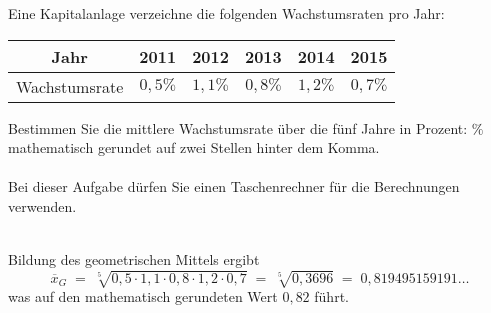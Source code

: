 \begin{MIntro}
\begin{MExercise}
Eine Kapitalanlage verzeichne die folgenden Wachstumsraten pro Jahr:
\begin{center}
\begin{tabular}{|c|c|c|c|c|c|}
\hline
Jahr           & 2011 & 2012 & 2013 & 2014 & 2015 \\ \hline
Wachstumsrate  & $0,5\%$ & $1,1\%$ & $0,8\%$ & $1,2\%$ &  $0,7\%$ \\ \hline
\end{tabular}
\end{center}
Bestimmen Sie die mittlere Wachstumsrate über die fünf Jahre in Prozent:  $\%$ mathematisch gerundet auf zwei Stellen hinter dem Komma.
\ \\ \ \\
Bei dieser Aufgabe dürfen Sie einen Taschenrechner für die Berechnungen verwenden.
\ \\ \ \\
\begin{MHint}{\iSolution}
Bildung des geometrischen Mittels ergibt
$$
\overline{x}_G\; =\; \sqrt[5]{0,5\cdot 1,1\cdot 0,8\cdot 1,2\cdot 0,7}\; =\; \sqrt[5]{0,3696}\; =\; 0,819495159191\ldots
$$
was auf den mathematisch gerundeten Wert $0,82$ führt.
\end{MHint}
\end{MExercise}

\end{MIntro}

